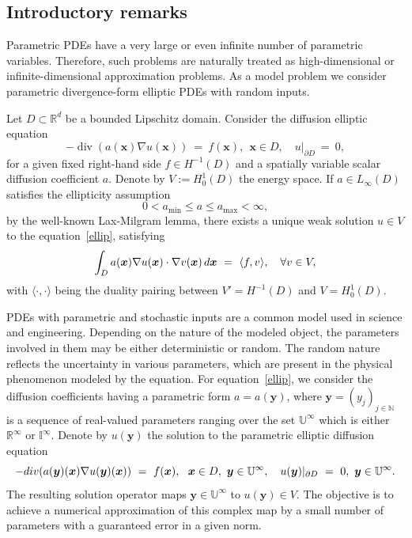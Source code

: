 \documentclass[11pt]{article}
\numberwithin{equation}{section}
\theoremstyle{definition}
\theoremstyle{remark}
\newcommand{\bx}{{\boldsymbol{x}}}
\newcommand{\by}{{\boldsymbol{y}}}
\newcommand{\rd}{{\rm d}}
\def\NN{{\mathbb N}}
\def\NN{{\mathbb N}}
\def\IIi{{\mathbb I}^\infty}
\def\UUi{{\mathbb U}^{\infty}}
\def\NN{{\mathbb N}}
\def\RRR{{\mathbb R}}
\def\RRRi{{\mathbb R}^\infty}
\def\dv{\operatorname{div}}
\begin{document}
 	\subsection{Introductory remarks} 
 	\label{Introducing remarks}
    Parametric PDEs have a very large or even infinite number of parametric variables. Therefore, such problems are naturally treated as high-dimensional or infinite-dimensional approximation problems.
    As a model problem we consider parametric divergence-form elliptic PDEs with random inputs.
 	
 	Let $D \subset \RRR^d$ be a bounded Lipschitz domain. Consider the diffusion elliptic equation 
 	\begin{equation} \label{ellip}
 		- \dv (a(\bx)\nabla u(\bx))
 		\ = \
 		f (\bx),\ \ \bx \in D,
 		\quad u|_{\partial D} \ = \ 0, 
 	\end{equation}
 	for a {given fixed right-hand side $f \in H^{-1}(D)$ and a 
 	spatially variable scalar diffusion coefficient $a$.
 	Denote by $V:= H^1_0(D)$ the energy space.} If $a \in L_\infty(D)$ satisfies the ellipticity assumption
 	\begin{equation} \nonumber
 		0<a_{\min} \leq a \leq a_{\max}<\infty,
 	\end{equation}
    by the well-known Lax-Milgram lemma, there exists a unique weak
 	solution $u \in V$ to the equation~\eqref{ellip}, satisfying  
 	\begin{equation} \nonumber
 		\int_{D} a(\bx)\nabla u(\bx) \cdot \nabla v(\bx) \, \rd \bx
 		\ = \
 		\langle f , v \rangle, \quad \forall v \in V,
 	\end{equation}
    with $\langle\cdot,\cdot\rangle$ being the duality pairing between $V'=H^{-1}(D)$ and $V=H_0^1(D)$.
 	
 	PDEs with parametric and stochastic inputs are a common model used in science
 	and engineering. Depending on the 
 	nature of the modeled object, the parameters involved in them may be 
    either deterministic or random. The random nature reflects the uncertainty in various parameters,
    which are present in the physical phenomenon modeled by the equation.
 	For equation~\eqref{ellip}, 
 	we consider the diffusion coefficients having a parametric form $a=a(\by)$, where $\by=(y_j)_{j \in \NN}$
    is a sequence of real-valued parameters ranging over the set 
 	$\UUi$ which is either $\RRRi$ or $\IIi$.
 	Denote by $u(\by)$ the solution to the 
 	parametric  elliptic diffusion equation
 	\begin{equation} \label{parametricPDE}
 		- {\rm div} (a(\by)(\bx)\nabla u(\by)(\bx))
 		\ = \
        f {(\bx)}, \ \ \bx \in D, \ \by \in \UUi,
 		\quad u(\by)|_{\partial D} \ = \ 0, \ \by \in \UUi. 
 	\end{equation}	
 	The resulting solution operator maps
 	$\by\in \UUi$ to $u(\by)\in V$. The objective is to 
 	achieve a numerical 
 	approximation of this complex map by a small number of parameters with a
 	guaranteed error in a given norm. 
 	
\end{document}
